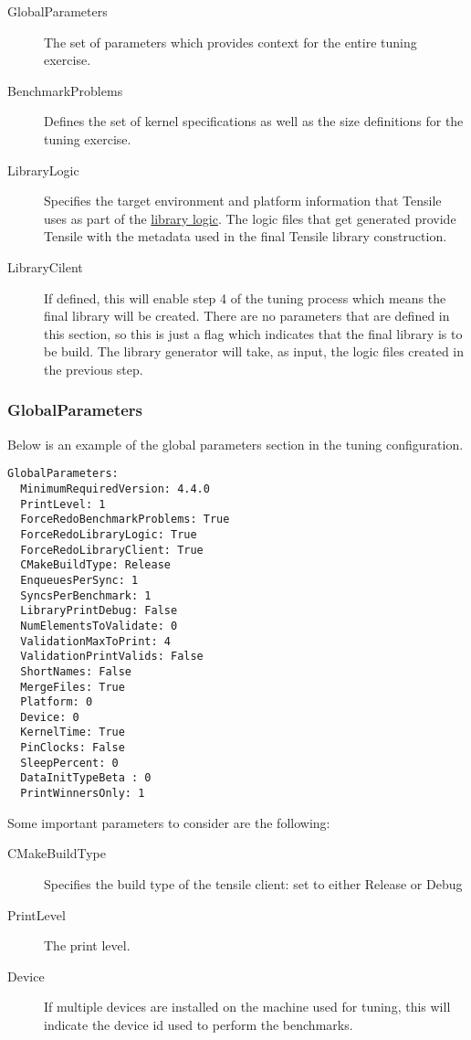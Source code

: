 \documentclass[]{article}
\begin{document}
\begin{description}
\item[GlobalParameters] The set of parameters which provides context for the entire tuning exercise.
\item[BenchmarkProblems] Defines the set of kernel specifications as well as the size definitions for the tuning exercise.
\item[LibraryLogic] Specifies the target environment and platform information that Tensile uses as part of the \hyperref[sec:LibraryLogic]{library logic}. The logic files that get generated provide Tensile with the metadata used in the final Tensile library construction.
\item[LibraryCilent] If defined, this will enable step 4 of the tuning process which means the final library will be created. There are no parameters that are defined in this section, so this is just a flag which indicates that the final library is to be build. The library generator will take, as input, the logic files created in the previous step.
\end{description}

\subsubsection{GlobalParameters}

Below is an example of the global parameters section in the tuning configuration.

\begin{verbatim}
GlobalParameters:
  MinimumRequiredVersion: 4.4.0
  PrintLevel: 1
  ForceRedoBenchmarkProblems: True
  ForceRedoLibraryLogic: True
  ForceRedoLibraryClient: True
  CMakeBuildType: Release
  EnqueuesPerSync: 1
  SyncsPerBenchmark: 1
  LibraryPrintDebug: False
  NumElementsToValidate: 0
  ValidationMaxToPrint: 4
  ValidationPrintValids: False
  ShortNames: False
  MergeFiles: True
  Platform: 0
  Device: 0
  KernelTime: True
  PinClocks: False
  SleepPercent: 0
  DataInitTypeBeta : 0
  PrintWinnersOnly: 1
\end{verbatim}

\noindent
Some important parameters to consider are the following:
\begin{description}
\item[CMakeBuildType] Specifies the build type of the tensile client: set to either Release or Debug
\item[PrintLevel] The print level.
\item[Device] If multiple devices are installed on the machine used for tuning, this will indicate the device id used to perform the benchmarks.
\end{description}
\end{document}
